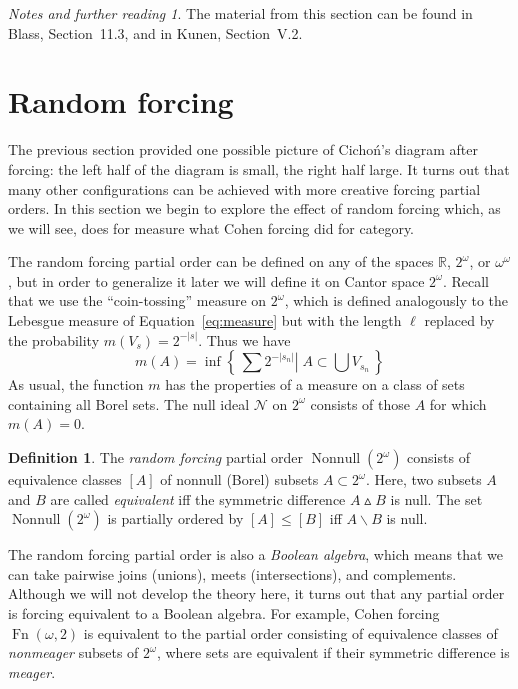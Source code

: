 \documentclass[11pt,oneside]{amsbook}
\newcommand{\set}[1]{\left\{\,#1\,\right\}}
\newcommand{\R}{\mathbb R}
\newcommand{\Null}{\mathcal N}
\DeclareMathOperator{\Fn}{Fn}
\DeclareMathOperator{\Nonnull}{Nonnull}
\theoremstyle{definition}
\theoremstyle{plain}
\theoremstyle{definition}
\newtheorem{definition}[theorem]{Definition}
\theoremstyle{remark}
\newtheorem*{notes}{Notes and further reading}
\numberwithin{equation}{section}
\numberwithin{figure}{section}
\begin{document}
\begin{notes}
  The material from this section can be found in Blass, Section~11.3, and in Kunen, Section~V.2.
\end{notes}


\newpage
\section{Random forcing}

The previous section provided one possible picture of Cicho\'n's diagram after forcing: the left half of the diagram is small, the right half large. It turns out that many other configurations can be achieved with more creative forcing partial orders. In this section we begin to explore the effect of random forcing which, as we will see, does for measure what Cohen forcing did for category.

The random forcing partial order can be defined on any of the spaces $\R$, $2^\omega$, or $\omega^\omega$, but in order to generalize it later we will define it on Cantor space $2^\omega$. Recall that we use the ``coin-tossing'' measure on $2^\omega$, which is defined analogously to the Lebesgue measure of Equation~\eqref{eq:measure} but with the length $\ell$ replaced by the probability $m(V_s)=2^{-|s|}$. Thus we have
\[m(A)=\inf\set{\sum2^{-|s_n|}\left|\; A\subset\bigcup V_{s_n}\right.}
\]
As usual, the function $m$ has the properties of a measure on a class of sets containing all Borel sets. The null ideal $\Null$ on $2^\omega$ consists of those $A$ for which $m(A)=0$.

\begin{definition}
  The \emph{random forcing} partial order $\Nonnull(2^\omega)$ consists of equivalence classes $[A]$ of nonnull (Borel) subsets $A\subset2^\omega$. Here, two subsets $A$ and $B$ are called \emph{equivalent} iff the symmetric difference $A\mathbin{\vartriangle} B$ is null. The set $\Nonnull(2^\omega)$ is partially ordered by $[A]\leq[B]$ iff $A\smallsetminus B$ is null.
\end{definition}

The random forcing partial order is also a \emph{Boolean algebra}, which means that we can take pairwise joins (unions), meets (intersections), and complements. Although we will not develop the theory here, it turns out that any partial order is forcing equivalent to a Boolean algebra. For example, Cohen forcing $\Fn(\omega,2)$ is equivalent to the partial order consisting of equivalence classes of \emph{nonmeager} subsets of $2^\omega$, where sets are equivalent if their symmetric difference is \emph{meager}.
\end{document}
